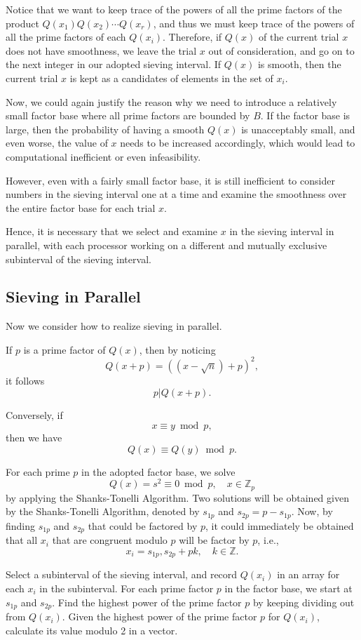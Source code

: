 \documentclass[letterpaper, 10pt, conference]{ieeeconf}  %
\theoremstyle{definition}
\theoremstyle{property}
\begin{document}
Notice that we want to keep trace of the powers of all the prime factors of the product $Q(x_1)Q(x_2)\cdots Q(x_r)$, and thus we must keep trace of the powers of all the prime factors of each $Q(x_i)$. Therefore, if $Q(x)$ of the current trial $x$ does not have smoothness, we leave the trial $x$ out of consideration, and go on to the next integer in our adopted sieving interval. If $Q(x)$ is smooth, then the current trial $x$ is kept as a candidates of elements in the set of $x_i$. 

Now, we could again justify the reason why we need to introduce a relatively small factor base where all prime factors are bounded by $B$. If the factor base is large, then the probability of having a smooth $Q(x)$ is unacceptably small, and even worse, the value of $x$ needs to be increased accordingly, which would lead to computational inefficient or even infeasibility.

However, even with a fairly small factor base, it is still inefficient to consider numbers in the sieving interval one at a time and examine the smoothness over the entire factor base for each trial $x$. 

Hence, it is necessary that we select and examine $x$ in the sieving interval in parallel, with each processor working on a different and mutually exclusive subinterval of the sieving interval.

\subsection{Sieving in Parallel}
Now we consider how to realize sieving in parallel.

If $p$ is a prime factor of $Q(x)$, then by noticing 
$$Q(x+p) = \left((x-\sqrt{n})+p\right)^2,$$
it follows 
$$p|Q(x+p).$$

Conversely, if 
$$x\equiv y\bmod p,$$
then we have 
$$Q(x)\equiv Q(y)\bmod p.$$

For each prime $p$ in the adopted factor base, we solve 
$$Q(x)=s^2\equiv 0\bmod p, \quad x\in \mathbb{Z}_p$$
by applying the Shanks-Tonelli Algorithm. Two solutions will be obtained given by the Shanks-Tonelli Algorithm, denoted by $s_{1p}$ and $s_{2p} = p-s_{1p}$. Now, by finding $s_{1p}$ and $s_{2p}$ that could be factored by $p$, it could immediately be obtained that all $x_i$ that are congruent modulo $p$ will be factor by $p$, i.e., $$x_i = s_{1p}, s_{2p} + pk, \quad k\in \mathbb{Z}.$$

Select a subinterval of the sieving interval, and record $Q(x_i)$ in an array for each $x_i$ in the subinterval. For each prime factor $p$ in the factor base, we start at $s_{1p}$ and $s_{2p}$. Find the highest power of the prime factor $p$ by keeping dividing out from $Q(x_i)$. Given the highest power of the prime factor $p$ for $Q(x_i)$, calculate its value modulo 2 in a vector.
\end{document}
